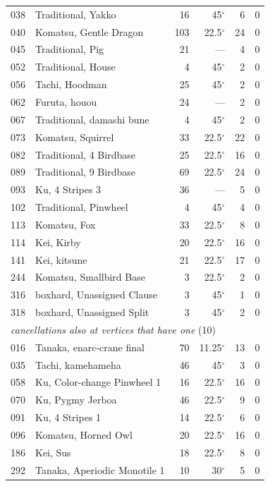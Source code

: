\documentclass[11pt]{article}
\theoremstyle{definition}
\theoremstyle{remark}
\begin{document}
{\begin{longtable}{rl r r r r}
038 & Traditional, Yakko & 16 & 45$^\circ$ & 6 & 0 \\
040 & Komatsu, Gentle Dragon & 103 & 22.5$^\circ$ & 24 & 0 \\
045 & Traditional, Pig & 21 & --- & 4 & 0 \\
052 & Traditional, House & 4 & 45$^\circ$ & 2 & 0 \\
056 & Tachi, Hoodman & 25 & 45$^\circ$ & 2 & 0 \\
062 & Furuta, houou & 24 & --- & 2 & 0 \\
067 & Traditional, damashi bune & 4 & 45$^\circ$ & 2 & 0 \\
073 & Komatsu, Squirrel & 33 & 22.5$^\circ$ & 22 & 0 \\
082 & Traditional, 4 Birdbase & 25 & 22.5$^\circ$ & 16 & 0 \\
089 & Traditional, 9 Birdbase & 69 & 22.5$^\circ$ & 24 & 0 \\
093 & Ku, 4 Stripes 3 & 36 & --- & 5 & 0 \\
102 & Traditional, Pinwheel & 4 & 45$^\circ$ & 4 & 0 \\
113 & Komatsu, Fox & 33 & 22.5$^\circ$ & 8 & 0 \\
114 & Kei, Kirby & 20 & 22.5$^\circ$ & 16 & 0 \\
141 & Kei, kitsune & 21 & 22.5$^\circ$ & 17 & 0 \\
244 & Komatsu, Smallbird Base & 3 & 22.5$^\circ$ & 2 & 0 \\
316 & boxhard, Unassigned Clause & 3 & 45$^\circ$ & 1 & 0 \\
318 & boxhard, Unassigned Split & 3 & 45$^\circ$ & 2 & 0 \\
\midrule\multicolumn{6}{l}{\emph{cancellations also at vertices that have one} (10)}\\
016 & Tanaka, enarc-crane final & 70 & 11.25$^\circ$ & 13 & 0 \\
035 & Tachi, kamehameha & 46 & 45$^\circ$ & 3 & 0 \\
058 & Ku, Color-change Pinwheel 1 & 16 & 22.5$^\circ$ & 16 & 0 \\
070 & Ku, Pygmy Jerboa & 46 & 22.5$^\circ$ & 9 & 0 \\
091 & Ku, 4 Stripes 1 & 14 & 22.5$^\circ$ & 6 & 0 \\
096 & Komatsu, Horned Owl & 20 & 22.5$^\circ$ & 16 & 0 \\
186 & Kei, Sus & 18 & 22.5$^\circ$ & 8 & 0 \\
292 & Tanaka, Aperiodic Monotile 1 & 10 & 30$^\circ$ & 5 & 0 \\

\end{longtable}}
\end{document}
